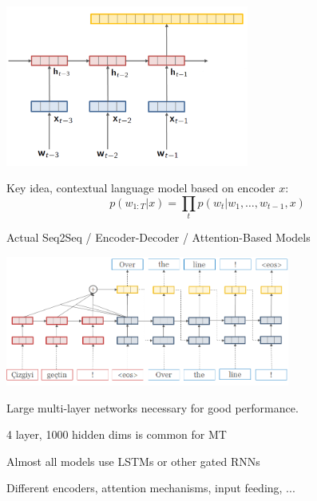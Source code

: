 \documentclass{beamer}
\let\tempone\itemize
\let\temptwo\enditemize
\renewenvironment{itemize}{\tempone\addtolength{\itemsep}{0.5\baselineskip}}{\temptwo}
\newcommand{\air}{\vspace{0.25cm}}
\newcommand{\cvec}{\mathbf{c}}
\begin{document}
\begin{frame}
  \begin{center}
  \end{center}
    \air 
   
    \begin{center}
      \includegraphics[width=0.6\textwidth]{rnnlm6}
    \end{center}
  \begin{itemize}
  \item Key idea, contextual language model based on encoder $x$: 
  \end{itemize}
  \[ p(w_{1:T} | x) = \prod_{t} p(w_t | w_1, \ldots, w_{t-1}, x) \] 
  
\end{frame}


\begin{frame}
  \begin{center}
    Actual Seq2Seq / Encoder-Decoder / Attention-Based Models
  \end{center}
    \begin{center}
      \includegraphics[width=0.7\textwidth]{simple-attn}
    \end{center}
  \begin{itemize}
  \item Large multi-layer networks  necessary for good performance.
    \begin{itemize}
    \item 4 layer, 1000 hidden dims is common for MT
      \air
      \pause 

  \item Almost all models use LSTMs or other gated RNNs 
    \pause 

    \air
  \item Different encoders, attention mechanisms, input feeding, ...
    \end{itemize}
  \end{itemize}
\end{frame}
\end{document}
